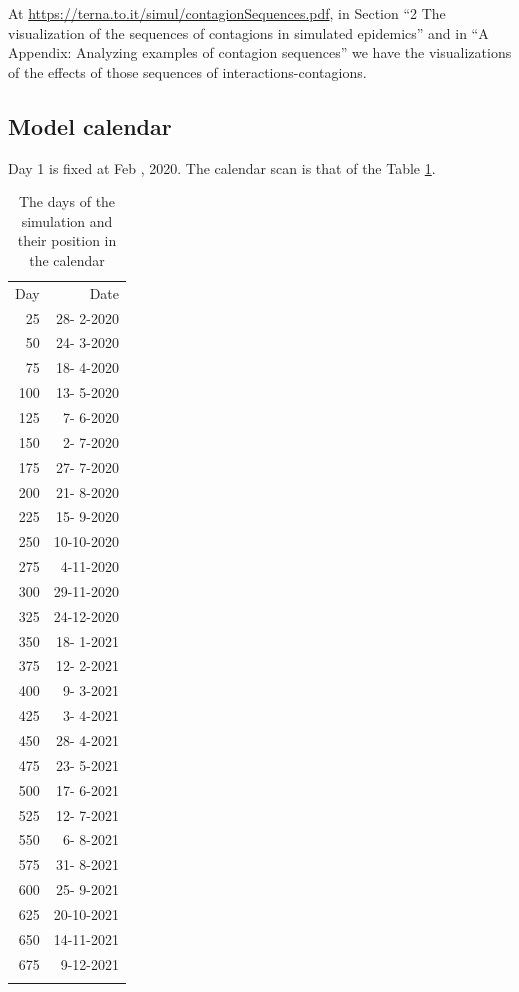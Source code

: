 \documentclass[graybox]{svmult}
\begin{document}
At \url{https://terna.to.it/simul/contagionSequences.pdf}, in Section ``2 The visualization of the sequences of contagions in simulated epidemics'' and in ``A Appendix: Analyzing examples of contagion sequences'' we have the visualizations of the effects of those sequences of interactions-contagions.


\subsection{Model calendar}\label{calend}

Day 1 is fixed at Feb , 2020. The calendar scan is that of the Table \ref{dates}.

\begin{table}[t]
\begin{footnotesize}
\begin{tabular}{rr}
\hline\noalign{\smallskip}
 Day & Date  \\
 \noalign{\smallskip}\svhline\noalign{\smallskip}
 25 & 28- 2-2020 \\
 50 & 24- 3-2020 \\
 75 & 18- 4-2020 \\
100 & 13- 5-2020 \\
125 &  7- 6-2020 \\
150 &  2- 7-2020 \\
175 & 27- 7-2020 \\
200 & 21- 8-2020 \\
225 & 15- 9-2020 \\
250 & 10-10-2020 \\
275 &  4-11-2020 \\
300 & 29-11-2020 \\
325 & 24-12-2020 \\
350 & 18- 1-2021 \\
375 & 12- 2-2021 \\
400 &  9- 3-2021 \\
425 &  3- 4-2021 \\
450 & 28- 4-2021 \\
475 & 23- 5-2021 \\
500 & 17- 6-2021 \\
525 & 12- 7-2021 \\
550 &  6- 8-2021 \\
575 & 31- 8-2021 \\
600 & 25- 9-2021 \\
625 & 20-10-2021 \\
650 & 14-11-2021 \\
675 &  9-12-2021 \\
\hline\noalign{\smallskip}
\end{tabular}
\end{footnotesize}
\caption{The days of the simulation and their position in the calendar}
\label{dates}
\end{table}
\end{document}
